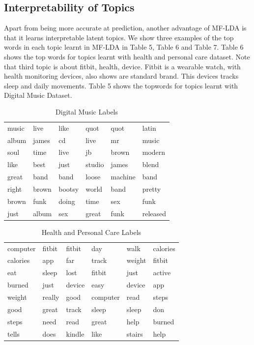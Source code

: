 \documentclass[10pt,conference]{IEEEtran}
\begin{document}
\subsection{Interpretability of Topics}
Apart from being more accurate at pred​iction, another advantage of MF-LDA is that it learns interpretable latent topics. We show three examples of the top words in each topic learnt in MF-LDA in Table 5, Table 6 and Table 7. Table 6 shows the top words for topics learnt with health and personal care dataset. Note that third topic is about fitbit, health, device. Fitbit is a wearable watch, with health monitoring devices, also shows are standard brand. This devices tracks sleep and daily movements. Table 5 shows the topwords for topics learnt with Digital Music Dataset.

\begin{table}[h]
\centering
\caption{Digital Music Labels}
\label{Digital Music Labels}
\begin{tabular}{ llllll }
\toprule
music  & live  & like  & quot  & quot & latin \\
album  & james  & cd  & live  & mr & music \\
soul   & time  & live  & jb  & brown & modern \\ 
like  & best  & just  & studio  & james & blend \\ 
great    & band  & band  & loose  & machine & band \\ 
right  & brown & bootsy  & world & band & pretty \\ 
brown   & funk  & doing  &  time  &  sex & funk \\ 
just   & album  & sex & great &  funk & released \\ 
\toprule          
\end{tabular}
\end{table}


\begin{table}[h]
\centering
\caption{Health and Personal Care Labels}
\label{Health and Personal Care Labels}
\begin{tabular}{ llllll }
\toprule
computer & fitbit & fitbit & day & walk & calories \\
calories & app & far & track & weight & fitbit \\
eat & sleep & lost & fitbit & just & active \\
burned & just & device & easy & device & app \\
weight & really & good & computer & read & steps \\
good & great & track & sleep & sleep & don \\
steps & need & read & great & help & burned \\
tells & does & kindle & like & stairs & help \\
\toprule          
\end{tabular}
\end{table}
\end{document}
